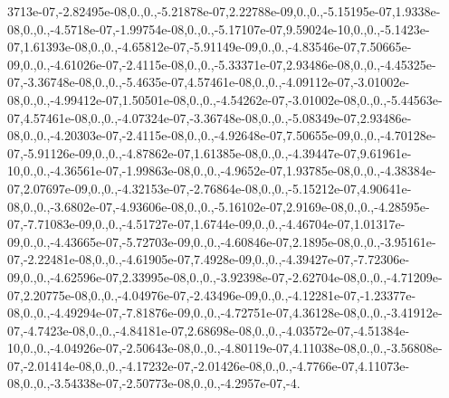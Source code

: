 \begin{DoxyCompactItemize}
\-3713e-\/07,-\/2.\-82495e-\/08,0.,0.,-\/5.\-21878e-\/07,2.\-22788e-\/09,0.,0.,-\/5.\-15195e-\/07,1.\-9338e-\/08,0.,0.,-\/4.\-5718e-\/07,-\/1.\-99754e-\/08,0.,0.,-\/5.\-17107e-\/07,9.\-59024e-\/10,0.,0.,-\/5.\-1423e-\/07,1.\-61393e-\/08,0.,0.,-\/4.\-65812e-\/07,-\/5.\-91149e-\/09,0.,0.,-\/4.\-83546e-\/07,7.\-50665e-\/09,0.,0.,-\/4.\-61026e-\/07,-\/2.\-4115e-\/08,0.,0.,-\/5.\-33371e-\/07,2.\-93486e-\/08,0.,0.,-\/4.\-45325e-\/07,-\/3.\-36748e-\/08,0.,0.,-\/5.\-4635e-\/07,4.\-57461e-\/08,0.,0.,-\/4.\-09112e-\/07,-\/3.\-01002e-\/08,0.,0.,-\/4.\-99412e-\/07,1.\-50501e-\/08,0.,0.,-\/4.\-54262e-\/07,-\/3.\-01002e-\/08,0.,0.,-\/5.\-44563e-\/07,4.\-57461e-\/08,0.,0.,-\/4.\-07324e-\/07,-\/3.\-36748e-\/08,0.,0.,-\/5.\-08349e-\/07,2.\-93486e-\/08,0.,0.,-\/4.\-20303e-\/07,-\/2.\-4115e-\/08,0.,0.,-\/4.\-92648e-\/07,7.\-50655e-\/09,0.,0.,-\/4.\-70128e-\/07,-\/5.\-91126e-\/09,0.,0.,-\/4.\-87862e-\/07,1.\-61385e-\/08,0.,0.,-\/4.\-39447e-\/07,9.\-61961e-\/10,0.,0.,-\/4.\-36561e-\/07,-\/1.\-99863e-\/08,0.,0.,-\/4.\-9652e-\/07,1.\-93785e-\/08,0.,0.,-\/4.\-38384e-\/07,2.\-07697e-\/09,0.,0.,-\/4.\-32153e-\/07,-\/2.\-76864e-\/08,0.,0.,-\/5.\-15212e-\/07,4.\-90641e-\/08,0.,0.,-\/3.\-6802e-\/07,-\/4.\-93606e-\/08,0.,0.,-\/5.\-16102e-\/07,2.\-9169e-\/08,0.,0.,-\/4.\-28595e-\/07,-\/7.\-71083e-\/09,0.,0.,-\/4.\-51727e-\/07,1.\-6744e-\/09,0.,0.,-\/4.\-46704e-\/07,1.\-01317e-\/09,0.,0.,-\/4.\-43665e-\/07,-\/5.\-72703e-\/09,0.,0.,-\/4.\-60846e-\/07,2.\-1895e-\/08,0.,0.,-\/3.\-95161e-\/07,-\/2.\-22481e-\/08,0.,0.,-\/4.\-61905e-\/07,7.\-4928e-\/09,0.,0.,-\/4.\-39427e-\/07,-\/7.\-72306e-\/09,0.,0.,-\/4.\-62596e-\/07,2.\-33995e-\/08,0.,0.,-\/3.\-92398e-\/07,-\/2.\-62704e-\/08,0.,0.,-\/4.\-71209e-\/07,2.\-20775e-\/08,0.,0.,-\/4.\-04976e-\/07,-\/2.\-43496e-\/09,0.,0.,-\/4.\-12281e-\/07,-\/1.\-23377e-\/08,0.,0.,-\/4.\-49294e-\/07,-\/7.\-81876e-\/09,0.,0.,-\/4.\-72751e-\/07,4.\-36128e-\/08,0.,0.,-\/3.\-41912e-\/07,-\/4.\-7423e-\/08,0.,0.,-\/4.\-84181e-\/07,2.\-68698e-\/08,0.,0.,-\/4.\-03572e-\/07,-\/4.\-51384e-\/10,0.,0.,-\/4.\-04926e-\/07,-\/2.\-50643e-\/08,0.,0.,-\/4.\-80119e-\/07,4.\-11038e-\/08,0.,0.,-\/3.\-56808e-\/07,-\/2.\-01414e-\/08,0.,0.,-\/4.\-17232e-\/07,-\/2.\-01426e-\/08,0.,0.,-\/4.\-7766e-\/07,4.\-11073e-\/08,0.,0.,-\/3.\-54338e-\/07,-\/2.\-50773e-\/08,0.,0.,-\/4.\-2957e-\/07,-\/4.\
\end{DoxyCompactItemize}
